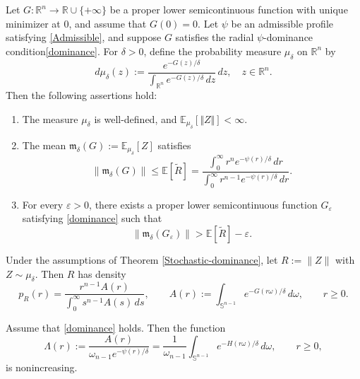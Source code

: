 \documentclass[10pt,a4paper]{amsart}
\begin{document}
\begin{theorem}\label{Stochastic-dominance}
    Let $G\colon \mathbb{R}^n \to \mathbb{R}\cup \{+\infty\}$ be a proper lower semicontinuous function with unique minimizer at $0$, and assume that $G(0)=0$. Let $\psi$ be an admissible profile satisfying \eqref{Admissible}, and suppose $G$ satisfies the radial $\psi$-dominance condition\eqref{dominance}. For $\delta>0$, define the probability measure \(\mu_\delta\) on
\(\mathbb{R}^n\) by
$$
d\mu_{\delta}(z):=\frac{e^{-G(z)/\delta}}{\int_{\mathbb{R}^n}e^{-G(z)/\delta}\,dz}\,dz, \quad z\in \mathbb{R}^n.
$$
Then the following assertions hold:
\begin{enumerate}
    \item[(i)] The measure $\mu_{\delta}$ is well-defined, and $\mathbb{E}_{\mu_{\delta}}[\Vert Z\Vert]<\infty$.
    \item[(ii)] The mean $\mathfrak{m}_\delta(G):=\mathbb{E}_{\mu_\delta}[Z]$ satisfies
    \begin{equation*}
        \|\mathfrak{m}_\delta(G)\|
        \le
        \mathbb{E}[\widetilde R]
        =
        \frac{\displaystyle \int_0^\infty r^n e^{-\psi(r)/\delta}\,dr}
        {\displaystyle \int_0^\infty r^{n-1} e^{-\psi(r)/\delta}\,dr}.
    \end{equation*}
    \item[(iii)] For every \(\varepsilon>0\), there exists a proper lower
    semicontinuous function \(G_\varepsilon\) satisfying
    \eqref{dominance}  such that
    \[
    \|\mathfrak{m}_\delta(G_\varepsilon)\|
    >
    \mathbb{E}[\widetilde R]-\varepsilon.
    \]
\end{enumerate}
\end{theorem}

\begin{lemma}\label{polar-decomposition}
Under the assumptions of Theorem \ref{Stochastic-dominance}, let \(R:=\|Z\|\) with \(Z\sim\mu_\delta\). Then \(R\) has density
\[
p_R(r)=\frac{r^{n-1}A(r)}{\displaystyle\int_0^\infty s^{n-1}A(s)\,ds},
\qquad
A(r):=\int_{\mathbb S^{n-1}} e^{-G(r\omega)/\delta}\,d\omega,
\qquad r\ge 0.
\]
\end{lemma}

\begin{lemma}\label{likelihood-ratio}
Assume that \eqref{dominance} holds. Then the function
\[
\Lambda(r):=\frac{A(r)}{\omega_{n-1}e^{-\psi(r)/\delta}}
=
\frac{1}{\omega_{n-1}}\int_{\mathbb{S}^{n-1}} e^{-H(r\omega)/\delta}\,d\omega,
\qquad r\ge 0,
\]
is nonincreasing.
\end{lemma}
\end{document}

